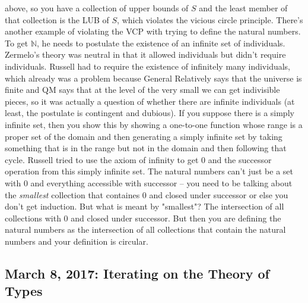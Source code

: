 \documentclass[12pt]{article}
\theoremstyle{definition}
\begin{document}
\begin{itemize}
        above, so you have a collection of upper bounds of $S$ and the least
        member of that collection is the LUB of $S$, which violates the vicious
        circle principle. There's another example of violating the VCP with
        trying to define the natural numbers. To get $\mathbb{N}$, he needs to
        postulate the existence of an infinite set of individuals. Zermelo's
        theory was neutral in that it allowed individuals but didn't require
        individuals. Russell had to require the existence of infinitely many
        individuals, which already was a problem because General Relatively
        says that the universe is finite and QM says that at the level of the
        very small we can get indivisible pieces, so it was actually a question
        of whether there are infinite individuals (at least, the postulate is
        contingent and dubious). If you suppose there is a simply infinite set,
        then you show this by showing a one-to-one function whose range is a
        proper set of the domain and then generating a simply infinite set by
        taking something that is in the range but not in the domain and then
        following that cycle. Russell tried to use the axiom of infinity to get
        0 and the successor operation from this simply infinite set. The
        natural numbers can't just be a set with 0 and everything accessible
        with successor -- you need to be talking about the \textit{smallest}
        collection that containes 0 and closed under successor or else you
        don't get induction. But what is meant by "smallest"? The intersection
        of all collections with 0 and closed under successor. But then you are
        defining the natural numbers as the intersection of all collections
        that contain the natural numbers and your definition is circular. 
\end{itemize}

\subsection{March 8, 2017: Iterating on the Theory of Types}
\end{document}

